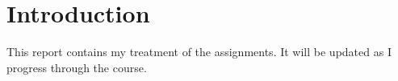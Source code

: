 \section{Introduction}
This report contains my treatment of the assignments. It will be updated as I progress through the course.